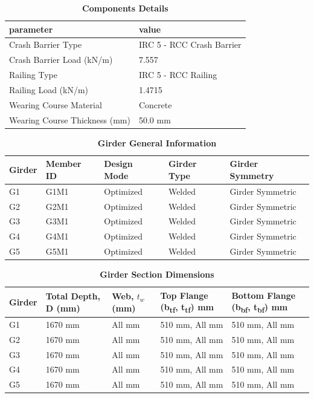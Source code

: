 \documentclass[12pt,a4paper]{report}
\numberwithin{table}{chapter}
\numberwithin{figure}{chapter}
\begin{document}
\begin{longtable}{|L{5.5cm}|p{10.0cm}|}
\caption{\textbf{Components Details}}
\hline
\textbf{parameter} & \textbf{value} \\
\hline
\textnormal{Crash Barrier Type} & IRC 5 - RCC Crash Barrier \\[6pt]
\hline
\textnormal{Crash Barrier Load (kN/m)} & 7.557 \\[6pt]
\hline

\textnormal{Railing Type} & IRC 5 - RCC Railing \\[6pt]
\hline
\textnormal{Railing Load (kN/m)} & 1.4715 \\[6pt]
\hline
\textnormal{Wearing Course Material} & Concrete \\[6pt]
\hline
\textnormal{Wearing Course Thickness (mm)} & 50.0 mm \\[6pt]
\hline
\end{longtable}


\newpage

\vspace{0.4em}
\noindent
            
\vspace{4pt}
\begin{longtable}{|L{2.2cm}|L{1.8cm}|p{3.8cm}|p{3.8cm}|p{3.8cm}|}
\caption{\textbf{Girder General Information}}
\hline
\textbf{Girder} & \textbf{Member ID} & \textbf{Design Mode} & \textbf{Girder Type} & \textbf{Girder Symmetry} \\[6pt]
\hline
G1 & G1M1 & Optimized & Welded & Girder Symmetric \\[8pt]
\hline
G2 & G2M1 & Optimized & Welded & Girder Symmetric \\[8pt]
\hline
G3 & G3M1 & Optimized & Welded & Girder Symmetric \\[8pt]
\hline
G4 & G4M1 & Optimized & Welded & Girder Symmetric \\[8pt]
\hline
G5 & G5M1 & Optimized & Welded & Girder Symmetric \\[8pt]
\hline
\end{longtable}

\vspace{0.6em}

\vspace{4pt}
\begin{longtable}{|L{1.8cm}|L{2.3cm}|L{1.8cm}|p{4.8cm}|p{4.8cm}|}
\caption{\textbf{Girder Section Dimensions}}
\hline
\textbf{Girder} & \textbf{Total Depth, D (mm)} & \textbf{Web, $t_w$ (mm)} & \textbf{Top Flange (b\textsubscript{tf}, t\textsubscript{tf}) mm} & \textbf{Bottom Flange (b\textsubscript{bf}, t\textsubscript{bf}) mm} \\[6pt]
\hline
G1 & 1670 mm & All mm & 510 mm, All mm & 510 mm, All mm \\[8pt]
\hline
G2 & 1670 mm & All mm & 510 mm, All mm & 510 mm, All mm \\[8pt]
\hline
G3 & 1670 mm & All mm & 510 mm, All mm & 510 mm, All mm \\[8pt]
\hline
G4 & 1670 mm & All mm & 510 mm, All mm & 510 mm, All mm \\[8pt]
\hline
G5 & 1670 mm & All mm & 510 mm, All mm & 510 mm, All mm \\[8pt]
\hline
\end{longtable}
\end{document}
